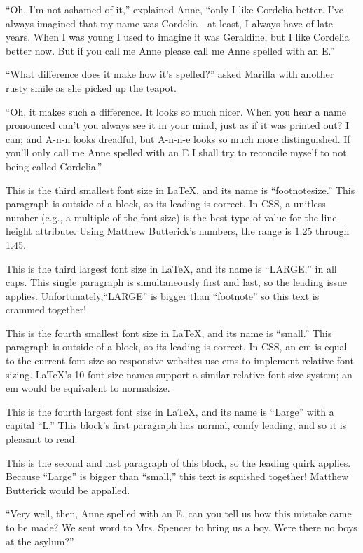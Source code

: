 \documentclass[a4paper]{article}
\begin{document}
{\scriptsize ``Oh, I'm not ashamed of it,'' explained Anne, ``only I like Cordelia better. I've always imagined that my name was Cordelia---at least, I always have of late years. When I was young I used to imagine it was Geraldine, but I like Cordelia better now. But if you call me Anne please call me Anne spelled with an E.''

``What difference does it make how it's spelled?'' asked Marilla with another rusty smile as she picked up the teapot.

``Oh, it makes such a difference. It looks so much nicer. When you hear a name pronounced can't you always see it in your mind, just as if it was printed out? I can; and A-n-n looks dreadful, but A-n-n-e looks so much more distinguished. If you'll only call me Anne spelled with an E I shall try to reconcile myself to not being called Cordelia.''}

\footnotesize This is the third smallest font size in \LaTeX, and its name is ``footnotesize.'' This paragraph is outside of a block, so its leading is correct. In CSS, a unitless number (e.g., a multiple of the font size) is the best type of value for the line-height attribute.  Using Matthew Butterick's numbers, the range is 1.25 through 1.45.

{\LARGE This is the third largest font size in \LaTeX, and its name is ``LARGE,'' in all caps. This single paragraph is simultaneously first and last, so the leading issue applies. Unfortunately,``LARGE'' is bigger than ``footnote''  so this text is crammed together!}

\small This is the fourth smallest font size in \LaTeX, and its name is ``small.'' This paragraph is outside of a block, so its leading is correct. In CSS, an em is equal to the current font size so responsive websites use ems to implement relative font sizing. \LaTeX's 10 font size names support a similar relative font size system; an em would be equivalent to normalsize.

{\Large This is the fourth largest font size in \LaTeX, and its name is ``Large'' with a capital ``L.'' This block's first paragraph has normal, comfy leading, and so it is pleasant to read.

This is the second and last paragraph of this block, so the leading quirk applies. Because ``Large'' is bigger than ``small,'' this text is squished together! Matthew Butterick would be appalled.}

\footnotesize``Very well, then, Anne spelled with an E, can you tell us how this mistake came to be made? We sent word to Mrs. Spencer to bring us a boy. Were there no boys at the asylum?''
\end{document}
